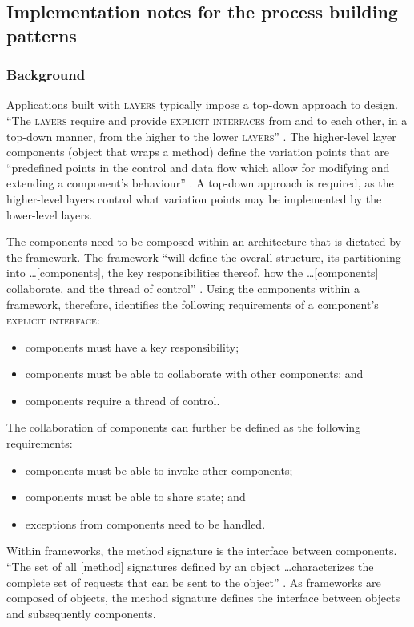 \documentclass[prodmode]{style/acmlarge}
\begin{document}
\subsection{Implementation notes for the process building patterns}

\subsubsection*{Background}

Applications built with \textsc{layers} typically impose a top-down approach to
design.  ``The \textsc{layers} require and provide \textsc{explicit interfaces}
from and to each other, in a top-down manner, from the higher to the lower
\textsc{layers}'' \cite[p. 11]{ioc}.  The higher-level layer components (object
that wraps a method) define the variation points that are
``predefined points in the control and data flow which allow for modifying and
extending a component's behaviour'' \cite[p. 5]{ioc}.  A top-down approach is
required, as the higher-level layers control what variation points may be
implemented by the lower-level layers.

The components need to be composed within an architecture that is dictated by
the framework.  The framework ``will define the overall structure, its
partitioning into \ldots [components], the key responsibilities thereof, how the
\ldots [components] collaborate, and the thread of control'' \cite[p.26]{gof}.
Using the components within a framework, therefore, identifies the following
requirements of a component's \textsc{explicit interface}:
\begin{itemize}
  \item components must have a key responsibility;
  \item components must be able to collaborate with other components; and
  \item components require a thread of control.
\end{itemize}

The collaboration of components can further be defined as the following
requirements:
\begin{itemize}
  \item components must be able to invoke other components;
  \item components must be able to share state; and
  \item exceptions from components need to be handled.
\end{itemize}

Within frameworks, the method signature is the interface between components.
``The set of all [method] signatures defined by an object \ldots characterizes
the complete set of requests that can be sent to the object'' \cite[p. 13]{gof}.
As frameworks are composed of objects, the method signature defines the
interface between objects and subsequently components.
\end{document}
